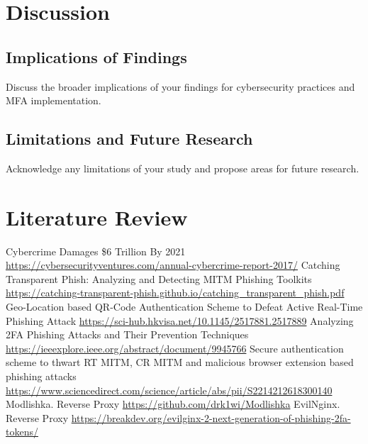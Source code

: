\documentclass [14pt]{extarticle}
\begin{document}
\section{Discussion}
\subsection{Implications of Findings}
Discuss the broader implications of your findings for cybersecurity practices and MFA implementation.
\subsection{Limitations and Future Research}
Acknowledge any limitations of your study and propose areas for future research.

\newpage
\section{Literature Review}


\newpage
\begin{thebibliography}{1}
 Cybercrime Damages \$6 Trillion By 2021 \url{https://cybersecurityventures.com/annual-cybercrime-report-2017/}
 Catching Transparent Phish: Analyzing and Detecting MITM Phishing Toolkits \url{https://catching-transparent-phish.github.io/catching_transparent_phish.pdf}
 Geo-Location based QR-Code Authentication Scheme to Defeat Active Real-Time Phishing Attack \url{https://sci-hub.hkvisa.net/10.1145/2517881.2517889}
 Analyzing 2FA Phishing Attacks and Their Prevention Techniques \url{https://ieeexplore.ieee.org/abstract/document/9945766}
 Secure authentication scheme to thwart RT MITM, CR MITM and malicious browser extension based phishing attacks \url{https://www.sciencedirect.com/science/article/abs/pii/S2214212618300140} 
 Modlishka. Reverse Proxy \url{https://github.com/drk1wi/Modlishka}
 EvilNginx. Reverse Proxy \url{https://breakdev.org/evilginx-2-next-generation-of-phishing-2fa-tokens/}
\end{thebibliography}
\end{document}
